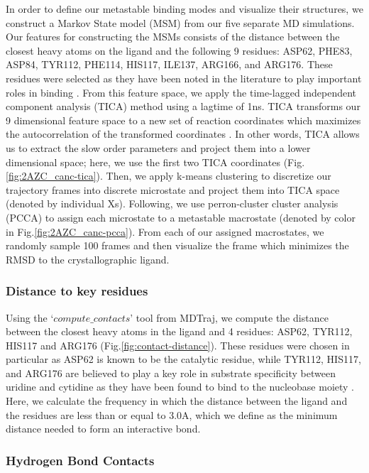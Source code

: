 In order to define our metastable binding modes and visualize their structures, we construct a Markov State model (MSM) \cite{prinz2011markov} from our five separate MD simulations.
Our features for constructing the MSMs consists of the distance between the closest heavy atoms on the ligand and the following 9 residues: ASP62, PHE83, ASP84, TYR112, PHE114, HIS117, ILE137, ARG166, and ARG176.
These residues were selected as they have been noted in the literature to play important roles in binding \cite{tanaka2016molecular}.
From this feature space, we apply the time-lagged independent component analysis (TICA) method using a lagtime of 1ns.
TICA transforms our 9 dimensional feature space to a new set of reaction coordinates which maximizes the autocorrelation of the transformed coordinates \cite{perez2013identification}.
In other words, TICA allows us to extract the slow order parameters and project them into a lower dimensional space; here, we use the first two TICA coordinates (Fig. \ref{fig:2AZC_canc-tica}).
Then, we apply k-means clustering to discretize our trajectory frames into discrete microstate and project them into TICA space (denoted by individual Xs).
Following, we use perron-cluster cluster analysis (PCCA) \cite{roblitz2013fuzzy} to assign each microstate to a metastable macrostate (denoted by color in Fig.\ref{fig:2AZC_canc-pcca}).
From each of our assigned macrostates, we randomly sample 100 frames and then visualize the frame which minimizes the RMSD to the crystallographic ligand.

\subsubsection*{Distance to key residues}
Using the `$compute\_contacts$' tool from MDTraj, we compute the distance between the closest heavy atoms in the ligand and 4 residues: ASP62, TYR112, HIS117 and ARG176 (Fig.\ref{fig:contact-distance}).
These residues were chosen in particular as ASP62 is known to be the catalytic residue, while TYR112, HIS117, and ARG176 are believed to play a key role in substrate specificity between uridine and cytidine as they have been found to bind to the nucleobase moiety \cite{tanaka2016molecular}.
Here, we calculate the frequency in which the distance between the ligand and the residues are less than or equal to 3.0A, which we define as the minimum distance needed to form an interactive bond.

\subsubsection*{Hydrogen Bond Contacts}

